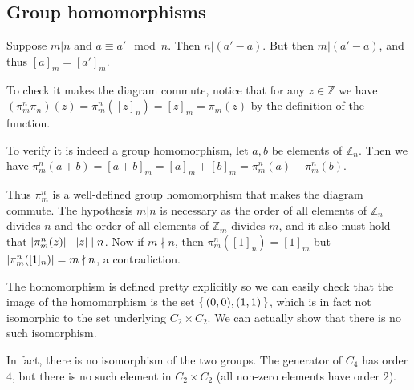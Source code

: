 \subsection{Group homomorphisms}

\begin{problem}
\end{problem}

\begin{solution}
	Suppose $m | n$ and $a \equiv a' \mod n$. Then $n | (a' - a)$. But then $m | (a' - a)$, and thus $[a]_m = [a']_m$.
	
	To check it makes the diagram commute, notice that for any $z \in \mathbb{Z}$ we have $(\pi^n_m \pi_n)(z)=\pi^n_m([z]_n)=[z]_m=\pi_m(z)$ by the definition of the function.
	
	To verify it is indeed a group homomorphism, let $a,b$ be elements of $\mathbb{Z}_n$. Then we have $\pi^n_m(a+b)=[a+b]_m=[a]_m + [b]_m = \pi^n_m(a) + \pi^n_m(b)$.
	
	Thus $\pi^n_m$ is a well-defined group homomorphism that makes the diagram commute. The hypothesis $m | n$ is necessary as the order of all elements of $\mathbb{Z}_n$ divides $n$ and the order of all elements of $\mathbb{Z}_m$ divides $m$, and it also must hold that $\left|\pi^n_m(z)\right| \mid \left|z\right| \mid n$. Now if $m \nmid n$, then $\pi^n_m([1]_n)=[1]_m$ but $\left|\pi^n_m([1]_n)\right|=m \nmid n$, a contradiction.
\end{solution}

\begin{problem}
\end{problem}

\begin{solution}
	The homomorphism is defined pretty explicitly so we can easily check that the image of the homomorphism is the set $\left\{\,(0,0),(1,1)\,\right\}$, which is in fact not isomorphic to the set underlying $C_2 \times C_2$. We can actually show that there is no such isomorphism. 
	
	In fact, there is no isomorphism of the two groups. The generator of $C_4$ has order $4$, but there is no such element in $C_2 \times C_2$ (all non-zero elements have order $2$).
\end{solution}

\begin{problem}
\end{problem}

